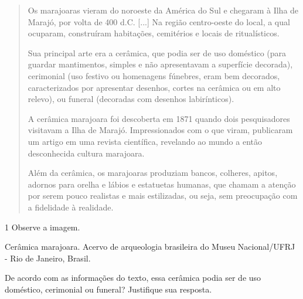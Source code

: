 \begin{quote}
Os marajoaras vieram do noroeste da América do Sul e chegaram à Ilha de
Marajó, por volta de 400 d.C. {[}...{]} Na região centro-oeste do local,
a qual ocuparam, construíram habitações, cemitérios e locais de
ritualísticos.

Sua principal arte era a cerâmica, que podia ser de uso doméstico (para
guardar mantimentos, simples e não apresentavam a superfície decorada),
cerimonial (uso festivo ou homenagens fúnebres, eram bem decorados,
caracterizados por apresentar desenhos, cortes na cerâmica ou em alto
relevo), ou funeral (decoradas com desenhos labirínticos).




A cerâmica marajoara foi descoberta em 1871 quando dois pesquisadores
visitavam a Ilha de Marajó. Impressionados com o que viram, publicaram
um artigo em uma revista científica, revelando ao mundo a então
desconhecida cultura marajoara.

Além da cerâmica, os marajoaras produziam bancos, colheres, apitos,
adornos para orelha e lábios e estatuetas humanas, que chamam a atenção
por serem pouco realistas e mais estilizadas, ou seja, sem preocupação
com a fidelidade à realidade.

\end{quote}

\num{1} Observe a imagem.

Cerâmica marajoara. Acervo de arqueologia brasileira do Museu
Nacional/UFRJ - Rio de Janeiro, Brasil.


De acordo com as informações do texto, essa cerâmica podia ser de uso
doméstico, cerimonial ou funeral? Justifique sua resposta.



